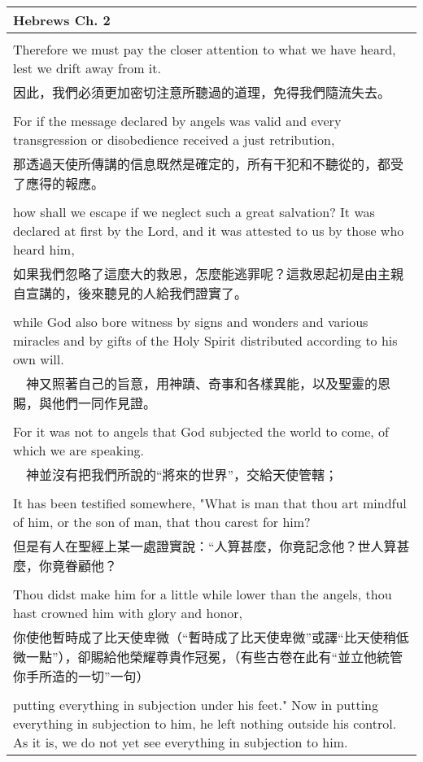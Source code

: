 \begin{tabularx}{\textwidth}{p{}}
\hline
Hebrews Ch. 2 \\
\hline \\
Therefore we must pay the closer attention to what we have heard, lest we drift away from it. \\
因此，我們必須更加密切注意所聽過的道理，免得我們隨流失去。 \\ \\
For if the message declared by angels was valid and every transgression or disobedience received a just retribution, \\
那透過天使所傳講的信息既然是確定的，所有干犯和不聽從的，都受了應得的報應。 \\ \\
how shall we escape if we neglect such a great salvation? It was declared at first by the Lord, and it was attested to us by those who heard him, \\
如果我們忽略了這麼大的救恩，怎麼能逃罪呢？這救恩起初是由主親自宣講的，後來聽見的人給我們證實了。 \\ \\
while God also bore witness by signs and wonders and various miracles and by gifts of the Holy Spirit distributed according to his own will. \\
　神又照著自己的旨意，用神蹟、奇事和各樣異能，以及聖靈的恩賜，與他們一同作見證。 \\ \\
For it was not to angels that God subjected the world to come, of which we are speaking. \\
　神並沒有把我們所說的“將來的世界”，交給天使管轄； \\ \\
It has been testified somewhere, "What is man that thou art mindful of him, or the son of man, that thou carest for him? \\
但是有人在聖經上某一處證實說：“人算甚麼，你竟記念他？世人算甚麼，你竟眷顧他？ \\ \\
Thou didst make him for a little while lower than the angels, thou hast crowned him with glory and honor, \\
你使他暫時成了比天使卑微（“暫時成了比天使卑微”或譯“比天使稍低微一點”），卻賜給他榮耀尊貴作冠冕，（有些古卷在此有“並立他統管你手所造的一切”一句） \\ \\
putting everything in subjection under his feet." Now in putting everything in subjection to him, he left nothing outside his control. As it is, we do not yet see everything in subjection to him. \\

\end{tabularx}
